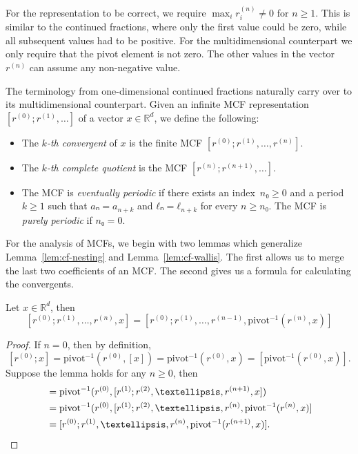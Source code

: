 For the representation to be correct, we require $\max_i r_i^{(n)} ≠ 0$ for $n ≥ 1$.
This is similar to the continued fractions, where only the first value could be zero,
while all subsequent values had to be positive.
For the multidimensional counterpart we only require that the pivot element is not zero.
The other values in the vector $r^{(n)}$ can assume any non-negative value.

The terminology from one-dimensional continued fractions naturally carry over to its
multidimensional counterpart.
Given an infinite MCF representation~$[r^{(0)}; r^{(1)}, …]$ of a vector $x ∈ ℝ^d$, we define the following:

\begin{itemize}
  \item The \emph{$k$-th convergent} of $x$ is the finite MCF $[r^{(0)}; r^{(1)}, …, r^{(n)}]$.
  \item The \emph{$k$-th complete quotient} is the MCF $[r^{(n)}; r^{(n+1)}, …]$.
  \item The MCF is \emph{eventually periodic} if there exists an index~$n₀ ≥ 0$
    and a period~$k ≥ 1$ such that $aₙ = a_{n+k}$ and $ℓₙ = ℓ_{n+k}$
    for every $n ≥ n₀$.
    The MCF is \emph{purely periodic} if $n₀ = 0$.
\end{itemize}

For the analysis of MCFs,
we begin with two lemmas which generalize Lemma~\ref{lem:cf-nesting} and
Lemma~\vref{lem:cf-wallis}.
The first allows us to merge the last two coefficients of an MCF.
The second gives us a formula for calculating the convergents.

\begin{lemma}
  \label{lem:mdcf-nesting}
  Let $x ∈ ℝ^d$, then
  \[
    [r^{(0)}; r^{(1)}, …, r^{(n)}, x]
    = [r^{(0)}; r^{(1)}, …, r^{(n-1)}, \mathrm{pivot}^{-1}(r^{(n)}, x)]
  \]
\end{lemma}

\begin{proof}
  If $n = 0$, then by definition,
  \[
    [r^{(0)}; x] = \mathrm{pivot}^{-1}(r^{(0)}, [x]) = \mathrm{pivot}^{-1}(r^{(0)}, x) = [\mathrm{pivot}^{-1}(r^{(0)}, x)].
  \]
  Suppose the lemma holds for any $n ≥ 0$, then
  \begin{align*}
    [r^{(0)}; r^{(1)}, …, r^{(n+1)}, x]
    & = \mathrm{pivot}^{-1}(r^{(0)}, [r^{(1)}; r^{(2)}, …, r^{(n+1)}, x]) \\
    & = \mathrm{pivot}^{-1}(r^{(0)}, [r^{(1)}; r^{(2)}, …, r^{(n)}, \mathrm{pivot}^{-1}(r^{(n)}, x)] \\
    & = [r^{(0)}; r^{(1)}, …, r^{(n)}, \mathrm{pivot}^{-1}(r^{(n+1)}, x)]. \qedhere
  \end{align*}
\end{proof}

